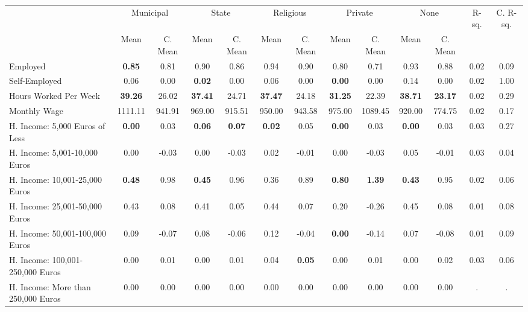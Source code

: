 \begin{tabular}{l c c c c c c c c c c c c}
\toprule
& \multicolumn{2}{c}{Municipal} & \multicolumn{2}{c}{State} & \multicolumn{2}{c}{Religious} & \multicolumn{2}{c}{Private} & \multicolumn{2}{c}{None} & R-sq. & C. R-sq. \\
& \scriptsize Mean & \scriptsize C. Mean & \scriptsize Mean & \scriptsize C. Mean & \scriptsize Mean & \scriptsize C. Mean & \scriptsize Mean & \scriptsize C. Mean & \scriptsize Mean & \scriptsize C. Mean & & \\
\midrule
Employed & \textbf{     0.85} & 0.81 &      0.90 & 0.86 &      0.94 & 0.90 &      0.80 & 0.71 &      0.93 & 0.88 &      0.02 &      0.09 \\
Self-Employed &      0.06 & 0.00 & \textbf{     0.02} & 0.00 &      0.06 & 0.00 & \textbf{     0.00} & 0.00 &      0.14 & 0.00 &      0.02 &      1.00 \\
Hours Worked Per Week & \textbf{    39.26} & 26.02 & \textbf{    37.41} & 24.71 & \textbf{    37.47} & 24.18 & \textbf{    31.25} & 22.39 & \textbf{    38.71} & \textbf{    23.17} &      0.02 &      0.29 \\
Monthly Wage &   1111.11 & 941.91 &    969.00 & 915.51 &    950.00 & 943.58 &    975.00 & 1089.45 &    920.00 & 774.75 &      0.02 &      0.17 \\
H. Income: 5,000 Euros of Less & \textbf{     0.00} & 0.03 & \textbf{     0.06} & \textbf{     0.07} & \textbf{     0.02} & 0.05 & \textbf{     0.00} & 0.03 & \textbf{     0.00} & 0.03 &      0.03 &      0.27 \\
H. Income: 5,001-10,000 Euros &      0.00 & -0.03 &      0.00 & -0.03 &      0.02 & -0.01 &      0.00 & -0.03 &      0.05 & -0.01 &      0.03 &      0.04 \\
H. Income: 10,001-25,000 Euros & \textbf{     0.48} & 0.98 & \textbf{     0.45} & 0.96 &      0.36 & 0.89 & \textbf{     0.80} & \textbf{     1.39} & \textbf{     0.43} & 0.95 &      0.02 &      0.06 \\
H. Income: 25,001-50,000 Euros &      0.43 & 0.08 &      0.41 & 0.05 &      0.44 & 0.07 &      0.20 & -0.26 &      0.45 & 0.08 &      0.01 &      0.08 \\
H. Income: 50,001-100,000 Euros &      0.09 & -0.07 &      0.08 & -0.06 &      0.12 & -0.04 & \textbf{     0.00} & -0.14 &      0.07 & -0.08 &      0.01 &      0.09 \\
H. Income: 100,001-250,000 Euros &      0.00 & 0.01 &      0.00 & 0.01 &      0.04 & \textbf{     0.05} &      0.00 & 0.01 &      0.00 & 0.02 &      0.03 &      0.06 \\
H. Income: More than 250,000 Euros &      0.00 & 0.00 &      0.00 & 0.00 &      0.00 & 0.00 &      0.00 & 0.00 &      0.00 & 0.00 &         . &         . \\
\bottomrule
\end{tabular}
